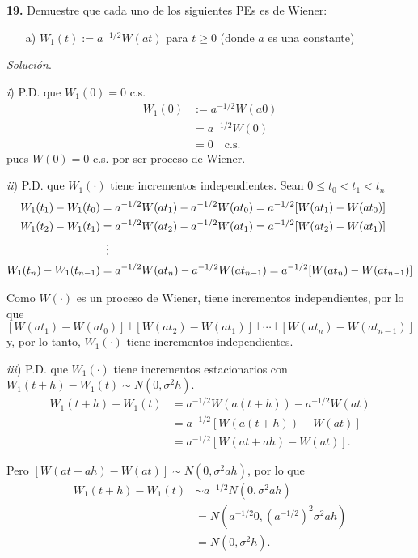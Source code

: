 \documentclass[12pt]{article}
\begin{document}
\begin{tcolorbox}[colback=blue!5!white, colframe=blue!5!white, arc=0mm, boxrule=0pt]  
    \textbf{19.} Demuestre que cada uno de los siguientes PEs es de Wiener:
    \begin{itemize}
        \item[a)] $W_1(t) := a^{-1/2} W(at)$ para $t \geq 0$ (donde $a$ es una constante)
    \end{itemize}
\end{tcolorbox}

\textit{Solución}.

\textit{i}) P.D. que $W_1(0) = 0$ c.s.
\begin{align*}
    W_1(0) &:= a^{-1/2}W(a0) \\
    &= a^{-1/2}W(0) \\
    &= 0 \quad \textrm{c.s.}
\end{align*}
pues $W(0) = 0$ c.s. por ser proceso de Wiener.

\textit{ii})  P.D. que $W_1(\cdot)$ tiene incrementos independientes. Sean $0 \leq t_0 < t_1 < t_n$
\begin{align*}
    W_1(t_1) - W_1(t_0) &= a^{-1/2}W(at_1) - a^{-1/2}W(at_0) = a^{-1/2}[W(at_1)- W(at_0)] \\
    W_1(t_2) - W_1(t_1) &= a^{-1/2}W(at_2) - a^{-1/2}W(at_1) = a^{-1/2}[W(at_2)- W(at_1)] \\
    &\vdotswithin{=} \notag \\
    W_1(t_n) - W_1(t_{n-1}) &= a^{-1/2}W(at_n) - a^{-1/2}W(at_{n-1}) = a^{-1/2}[W(at_n)- W(at_{n-1})] \\
\end{align*}

Como $W(\cdot)$ es un proceso de Wiener, tiene incrementos independientes, por lo que 
\[ [W(at_1)- W(at_0)] \bot [W(at_2)- W(at_1)] \bot \cdots \bot [W(at_n)- W(at_{n-1})]  \]
y, por lo tanto, $W_1(\cdot)$ tiene incrementos independientes.

\textit{iii}) P.D. que $W_1(\cdot)$ tiene incrementos estacionarios con $W_1(t+h) - W_1(t) \sim N(0, \sigma^2 h)$.
\begin{align*}
    W_1(t+h) - W_1(t) &= a^{-1/2}W(a(t+h)) - a^{-1/2} W(at) \\
    &= a^{-1/2}[W(a(t+h)) - W(at)] \\
    &= a^{-1/2}[W(at+ah) - W(at)].
\end{align*}

Pero $[W(at+ah) - W(at)] \sim N(0, \sigma^2ah)$, por lo que
\begin{align*}
    W_1(t+h) - W_1(t) &\sim a^{-1/2} N(0, \sigma^2ah) \\
    &= N(a^{-1/2} 0, (a^{-1/2})^2 \sigma^2 ah) \\
    &= N(0, \sigma^2 h).
\end{align*}
\end{document}
